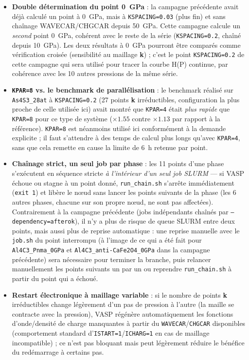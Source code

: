 \documentclass[11pt,a4paper]{article}
\begin{document}
\begin{itemize}
  \item \textbf{Double détermination du point 0~GPa} : la campagne précédente avait déjà calculé
  un point à 0~GPa, mais à \texttt{KSPACING=0.03} (plus fin) et sans chaînage WAVECAR/CHGCAR
  depuis 50~GPa. Cette campagne calcule un \emph{second} point 0~GPa, cohérent avec le reste de
  la série (\texttt{KSPACING=0.2}, chaîné depuis 10~GPa). Les deux résultats à 0~GPa pourront
  être comparés comme vérification croisée (sensibilité au maillage \textbf{k}) ; c'est le point
  \texttt{KSPACING=0.2} de cette campagne qui sera utilisé pour tracer la courbe H(P) continue,
  par cohérence avec les 10 autres pressions de la même série.
  \item \textbf{\texttt{KPAR=8} vs. le benchmark de parallélisation} : le benchmark réalisé sur
  \texttt{As4S3\_28at} à \texttt{KSPACING=0.2} (27 points \textbf{k} irréductibles, configuration
  la plus proche de celle utilisée ici) avait montré que \texttt{KPAR=4} était \emph{plus
  rapide} que \texttt{KPAR=8} pour ce type de système ($\times1.55$ contre $\times1.13$ par
  rapport à la référence). \texttt{KPAR=8} est néanmoins utilisé ici conformément à la demande
  explicite ; il faut s'attendre à des temps de calcul plus longs qu'avec \texttt{KPAR=4}, sans
  que cela remette en cause la limite de 6~h retenue par point.
  \item \textbf{Chaînage strict, un seul job par phase} : les 11 points d'une phase s'exécutent
  en séquence stricte \emph{à l'intérieur d'un seul job SLURM} — si VASP échoue ou stagne à un
  point donné, \texttt{run\_chain.sh} s'arrête immédiatement (\texttt{exit 1}) et libère le
  nœud sans lancer les points suivants de la phase (les 6 autres phases, chacune sur son propre
  nœud, ne sont pas affectées). Contrairement à la campagne précédente (jobs indépendants
  chaînés par \texttt{--dependency=afterok}), il n'y a plus de risque de queue SLURM entre deux
  points, mais aussi plus de reprise automatique : une reprise manuelle avec le \texttt{job.sh}
  du point interrompu (à l'image de ce qui a été fait pour \texttt{Al4C3\_Pnma\_0GPa} et
  \texttt{Al4C3\_anti-CaFe2O4\_0GPa} dans la campagne précédente) sera nécessaire pour terminer
  la branche, puis relancer manuellement les points suivants un par un ou reprendre
  \texttt{run\_chain.sh} à partir du point qui a échoué.
  \item \textbf{Restart électronique à maillage variable} : si le nombre de points \textbf{k}
  irréductibles change légèrement d'un pas de pression à l'autre (la maille se contracte avec
  la pression), VASP régénère automatiquement les fonctions d'onde/densité de charge manquantes
  à partir du \texttt{WAVECAR}/\texttt{CHGCAR} disponibles (comportement standard
  d'\texttt{ISTART=1}/\texttt{ICHARG=1} en cas de maillage incompatible) ; ce n'est pas bloquant
  mais peut légèrement réduire le bénéfice du redémarrage à certains pas.
\end{itemize}
\end{document}
